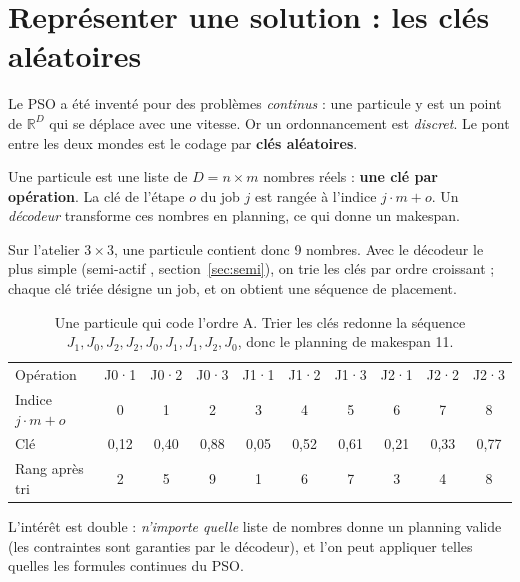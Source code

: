 \documentclass[11pt,a4paper]{article}
\begin{document}
\section{Représenter une solution : les clés aléatoires}

Le PSO a été inventé pour des problèmes \emph{continus} : une particule y est un point
de $\mathbb{R}^D$ qui se déplace avec une vitesse. Or un ordonnancement est
\emph{discret}. Le pont entre les deux mondes est le codage par \textbf{clés aléatoires}.

\begin{idee}
Une particule est une liste de $D = n \times m$ nombres réels : \textbf{une clé par
opération}. La clé de l'étape $o$ du job $j$ est rangée à l'indice $j\cdot m + o$.
Un \emph{décodeur} transforme ces nombres en planning, ce qui donne un makespan.
\end{idee}

Sur l'atelier $3\times3$, une particule contient donc 9 nombres. Avec le décodeur le plus
simple (\og semi-actif \fg{}, section~\ref{sec:semi}), on trie les clés par ordre
croissant ; chaque clé triée désigne un job, et on obtient une séquence de placement.

\begin{table}[h]
\centering
\caption{Une particule qui code l'ordre A. Trier les clés redonne la séquence
$J_1, J_0, J_2, J_2, J_0, J_1, J_1, J_2, J_0$, donc le planning de makespan 11.}
\label{tab:cles}
\small
\begin{tabular}{l*{9}{c}}
\toprule
Opération & J0·1 & J0·2 & J0·3 & J1·1 & J1·2 & J1·3 & J2·1 & J2·2 & J2·3\\
Indice $j\cdot m+o$ & 0 & 1 & 2 & 3 & 4 & 5 & 6 & 7 & 8\\
\midrule
Clé & 0,12 & 0,40 & 0,88 & 0,05 & 0,52 & 0,61 & 0,21 & 0,33 & 0,77\\
Rang après tri & 2 & 5 & 9 & 1 & 6 & 7 & 3 & 4 & 8\\
\bottomrule
\end{tabular}
\end{table}

L'intérêt est double : \emph{n'importe quelle} liste de nombres donne un planning valide
(les contraintes sont garanties par le décodeur), et l'on peut appliquer telles quelles
les formules continues du PSO.
\end{document}
